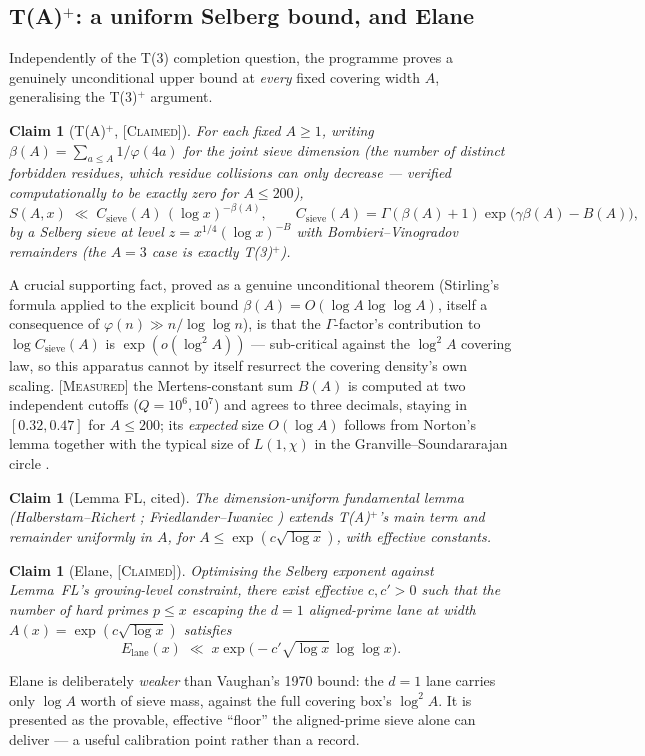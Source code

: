\documentclass[11pt]{article}
\theoremstyle{plain}
\newtheorem{claimstmt}[theorem]{Claim}
\theoremstyle{definition}
\theoremstyle{remark}
\newcommand{\CLAIMED}{\textcolor{claimed}{\textsc{[Claimed]}}}
\newcommand{\MEASURED}{\textcolor{claimed}{\textsc{[Measured]}}}
\renewcommand{\_}{\textunderscore\allowbreak}
\begin{document}
\subsection{T(A)$^+$: a uniform Selberg bound, and E\_lane}
\label{subsec:talane}

Independently of the T(3) completion question, the programme proves a genuinely unconditional
upper bound at \emph{every} fixed covering width $A$, generalising the T(3)$^+$ argument.
\begin{claimstmt}[T(A)$^+$, \CLAIMED]
For each fixed $A\ge1$, writing $\beta(A)=\sum_{a\le A}1/\varphi(4a)$ for the joint sieve
dimension (the number of distinct forbidden residues, which residue collisions can only
decrease — verified computationally to be exactly zero for $A\le200$),
\[
S(A,x) \;\ll\; C_{\mathrm{sieve}}(A)\,(\log x)^{-\beta(A)}, \qquad
C_{\mathrm{sieve}}(A) = \Gamma(\beta(A)+1)\exp\bigl(\gamma\beta(A)-B(A)\bigr),
\]
by a Selberg sieve at level $z=x^{1/4}(\log x)^{-B}$ with Bombieri--Vinogradov remainders (the
$A=3$ case is exactly T(3)$^+$).
\end{claimstmt}
A crucial supporting fact, proved as a genuine unconditional theorem (Stirling's formula applied
to the explicit bound $\beta(A)=O(\log A\log\log A)$, itself a consequence of $\varphi(n)\gg
n/\log\log n$), is that the $\Gamma$-factor's contribution to $\log C_{\mathrm{sieve}}(A)$ is
$\exp(o(\log^2A))$ — sub-critical against the $\log^2A$ covering law, so this apparatus cannot
by itself resurrect the covering density's own scaling. \MEASURED{} the Mertens-constant sum
$B(A)$ is computed at two independent cutoffs ($Q=10^6,10^7$) and agrees to three decimals,
staying in $[0.32,0.47]$ for $A\le200$; its \emph{expected} size $O(\log A)$ follows from
Norton's lemma \cite{Norton1976} together with the typical size of $L(1,\chi)$ in the
Granville--Soundararajan circle \cite{GranvilleSoundararajan2003}.
\begin{claimstmt}[Lemma FL, cited]
The dimension-uniform fundamental lemma (Halberstam--Richert \cite{HalberstamRichert1974};
Friedlander--Iwaniec \cite{OperaDeCribro}) extends T(A)$^+$'s main term and remainder uniformly
in $A$, for $A\le\exp(c\sqrt{\log x})$, with effective constants.
\end{claimstmt}
\begin{claimstmt}[E\_lane, \CLAIMED]
Optimising the Selberg exponent against Lemma~FL's growing-level constraint, there exist
effective $c,c'>0$ such that the number of hard primes $p\le x$ escaping the $d=1$
aligned-prime lane at width $A(x)=\exp(c\sqrt{\log x})$ satisfies
\[
E_{\mathrm{lane}}(x) \;\ll\; x\exp\bigl(-c'\sqrt{\log x}\,\log\log x\bigr).
\]
\end{claimstmt}
E\_lane is deliberately \emph{weaker} than Vaughan's 1970 bound: the $d=1$ lane carries only
$\log A$ worth of sieve mass, against the full covering box's $\log^2A$. It is presented as the
provable, effective ``floor'' the aligned-prime sieve alone can deliver — a useful calibration
point rather than a record.
\end{document}
